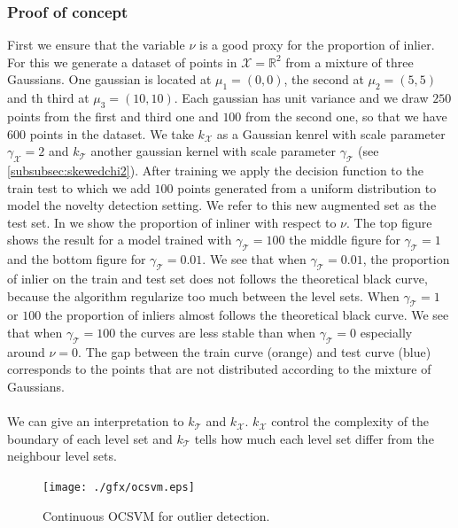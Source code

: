 \subsubsection{Proof of concept}
First we ensure that the variable $\nu$ is a good proxy for the proportion of
inlier. For this we generate a dataset of points in $\mathcal{X}=\mathbb{R}^2$
from a mixture of three Gaussians. One gaussian is located at $\mu_1=(0, 0)$,
the second at $\mu_2=(5, 5)$ and th third at $\mu_3 = (10, 10)$. Each gaussian
has unit variance and we draw $250$ points from the first and third one and
$100$ from the second one, so that we have $600$ points in the dataset.  We
take $k_{\mathcal{X}}$ as a Gaussian kenrel with scale parameter
$\gamma_{\mathcal{X}}=2$ and $k_{\mathcal{T}}$ another gaussian kernel with
scale parameter $\gamma_{\mathcal{T}}$ (see \cref{subsubsec:skewedchi2}). After
training we apply the decision function to the train test to which we add $100$
points generated from a uniform distribution to model the novelty detection
setting. We refer to this new augmented set as the test set.
In  we show the proportion of inliner with respect
to $\nu$. The top figure shows the result for a model trained with
$\gamma_{\mathcal{T}}=100$ the middle figure for $\gamma_{\mathcal{T}}=1$ and
the bottom figure for $\gamma_{\mathcal{T}}=0.01$. We see that when
$\gamma_{\mathcal{T}}=0.01$, the proportion of inlier on the train and test set
does not follows the theoretical black curve, because the algorithm regularize
too much between the level sets. When $\gamma_{\mathcal{T}}=1$ or $100$ the
proportion of inliers almost follows the theoretical black curve. We see that
when $\gamma_{\mathcal{T}}=100$ the curves are less stable than when
$\gamma_{\mathcal{T}}=0$ especially around $\nu=0$. The gap between the train
curve (orange) and test curve (blue) corresponds to the  points that
are not distributed according to the mixture of Gaussians.

\paragraph{}
We can give an interpretation to $k_{\mathcal{T}}$ and $k_{\mathcal{X}}$.
$k_{\mathcal{X}}$ control the complexity of the boundary of each level set and
$k_{\mathcal{T}}$ tells how much each level set differ from the neighbour level
sets.
\begin{figure}
    {\centering\texttt{[image: ./gfx/ocsvm.eps]}}
    \caption[Continuous OCSVM for outlier detection]{Continuous OCSVM for
    outlier detection. \label{fig:ocsvm_outlier}}
\end{figure}
